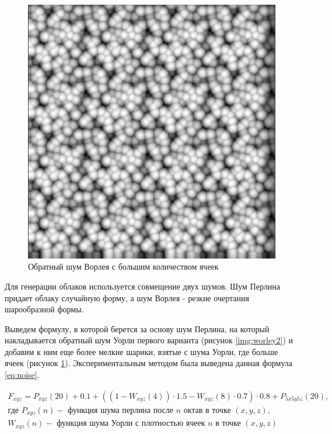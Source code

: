 \begin{figure}[H]
    \centering
    \includegraphics[scale=0.4]{img/worley3.png}
    \caption{Обратный шум Ворлея с большим количеством ячеек}
    \label{img:worley3}
\end{figure}

Для генерации облаков используется совмещение двух шумов. Шум Перлина придает
облаку случайную форму, а шум Ворлея - резкие очертания шарообразной формы.

Выведем формулу, в которой берется за основу шум Перлина, на который накладывается обратный шум Уорли первого варианта
(рисунок \ref{img:worley2}) и добавим к ним еще более мелкие шарики, взятые с шума Уорли, где больше ячеек (рисунок \ref{img:worley3}).
Экспериментальным методом была выведена данная формула \ref{eq:noise}.

\begin{equation}\label{eq:noise}
    \begin{matrix}
        F_{xyz} = P_{xyz}(20) + 0.1 + ((1 - W_{xyz}(4)) \cdot 1.5 - W_{xyz}(8) \cdot 0.7) \cdot 0.8 + P_{5x5y5z}(20), \\
        \text{где } P_{xyz}(n) - \text{ функция шума перлина после } n \text{ октав в точке } (x, y, z), \\
        W_{xyz}(n) - \text{ функция шума Уорли с плотностью ячеек } n \text{ в точке } (x, y, z) \\
    \end{matrix}
\end{equation}

